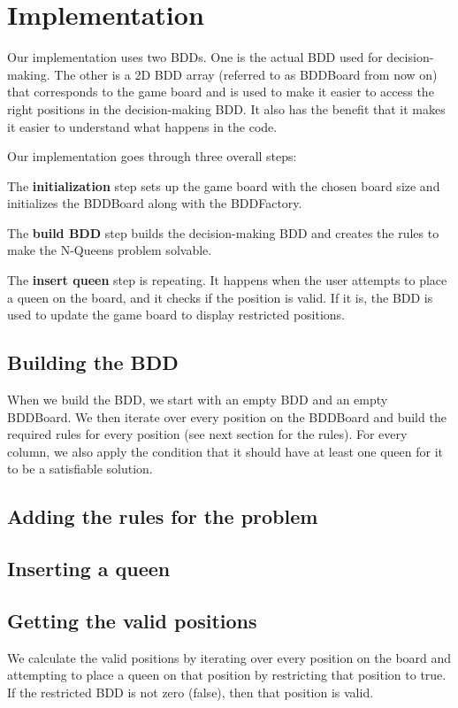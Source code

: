 \section{Implementation}
\label{Implementation}


Our implementation uses two BDDs. One is the actual BDD used for decision-making. The other is a 2D BDD array (referred to as BDDBoard from now on) that corresponds to the game board and is used to make it easier to access the right positions in the decision-making BDD. It also has the benefit that it makes it easier to understand what happens in the code.

Our implementation goes through three overall steps:
\begin{my_enumerate}

	\item The \textbf{initialization} step sets up the game board with the chosen board size and initializes the BDDBoard along with the BDDFactory.

	\item The \textbf{build BDD} step builds the decision-making BDD and creates the rules to make the N-Queens problem solvable.

	\item The \textbf{insert queen} step is repeating. It happens when the user attempts to place a queen on the board, and it checks if the position is valid. If it is, the BDD is used to update the game board to display restricted positions.

\end{my_enumerate}

\subsection{Building the BDD}

When we build the BDD, we start with an empty BDD and an empty BDDBoard. We then iterate over every position on the BDDBoard and build the required rules for every position (see next section for the rules). For every column, we also apply the condition that it should have at least one queen for it to be a satisfiable solution.

\subsection{Adding the rules for the problem}

\subsection{Inserting a queen}

\subsection{Getting the valid positions}
We calculate the valid positions by iterating over every position on the board and attempting to place a queen on that position by restricting that position to true. If the restricted BDD is not zero (false), then that position is valid.